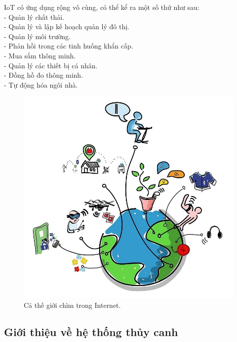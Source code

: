\documentclass[a4paper,12pt,oneside]{article}
\begin{document}
\noindent IoT có ứng dụng rộng vô cùng, có thể kể ra một số thứ như sau:\\
- Quản lý chất thải.\\
- Quản lý và lập kế hoạch quản lý đô thị.\\
- Quản lý môi trường.\\
- Phản hồi trong các tinh huống khẩn cấp.\\
- Mua sắm thông minh.\\
- Quản lý các thiết bị cá nhân.\\
- Đồng hồ đo thông minh.\\
- Tự động hóa ngôi nhà.\\
\begin{center}
\begin{figure}[htp]
\begin{center}
\includegraphics[scale=.4]{hinh/IoT_ungdung.jpg}
\end{center}
\caption{Cả thế giới chìm trong Internet.}

\end{figure}
\end{center}

\subsection{Giới thiệu về hệ thống thủy canh}
\end{document}
